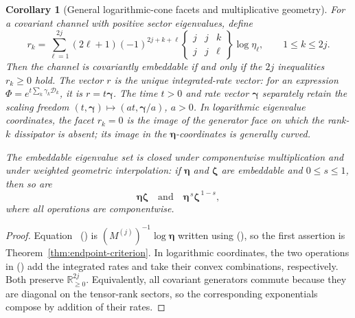 \documentclass[twoside,10pt]{article}
\numberwithin{equation}{section}
\theoremstyle{slbody}
\newtheorem{corollary}[theorem]{Corollary}
\theoremstyle{definition}
\theoremstyle{remark}
\newcommand{\cD}{\mathcal D}
\newcommand{\Rplus}{\mathbb R_{\geq 0}}
\renewcommand{\eqref}[1]{%
  \textup{{\normalfont(\oldstylenums{\ref{#1}}}\normalfont)}}
\begin{document}
\begin{corollary}[General logarithmic-cone facets and multiplicative geometry]
\label{cor:general-facets}
For a covariant channel with positive sector eigenvalues, define
\begin{equation}\label{eq:general-integrated-rates}
 r_k=\sum_{\ell=1}^{2j}(2\ell+1)(-1)^{2j+k+\ell}
 \begin{Bmatrix}j&j&k\\j&j&\ell\end{Bmatrix}\log\eta_\ell,
 \qquad 1\leq k\leq2j.
\end{equation}
Then the channel is covariantly embeddable if and only if the
\(2j\) inequalities \(r_k\geq0\) hold.  The vector \(r\) is the
unique integrated-rate vector: for an expression
\(\Phi=e^{t\sum_k\gamma_k\cD_k}\), it is \(r=t\bm\gamma\).
The time \(t>0\) and rate vector \(\bm\gamma\) separately retain the
scaling freedom \((t,\bm\gamma)\mapsto(at,\bm\gamma/a)\), \(a>0\).
In logarithmic eigenvalue coordinates,
the facet \(r_k=0\) is the image of the generator face on which the
rank-\(k\) dissipator is absent; its image in the \(\bm\eta\)-coordinates
is generally curved.

The embeddable eigenvalue set is closed under componentwise
multiplication and under weighted geometric interpolation: if
\(\bm\eta\) and \(\bm\zeta\) are embeddable and \(0\leq s\leq1\),
then so are
\begin{equation}\label{eq:multiplicative-geometry}
 \bm\eta\bm\zeta
 \quad\text{and}\quad
 \bm\eta^{\,s}\bm\zeta^{\,1-s},
\end{equation}
where all operations are componentwise.
\end{corollary}

\begin{proof}
Equation~\eqref{eq:general-integrated-rates} is
\((M^{(j)})^{-1}\log\bm\eta\) written using
\eqref{eq:M-inverse-formula}, so the first assertion is
Theorem~\ref{thm:endpoint-criterion}.  In logarithmic coordinates,
the two operations in \eqref{eq:multiplicative-geometry} add the
integrated rates and take their convex combinations, respectively.
Both preserve \(\Rplus^{2j}\).  Equivalently, all covariant generators
commute because they are diagonal on the tensor-rank sectors, so the
corresponding exponentials compose by addition of their rates.
\end{proof}
\end{document}
